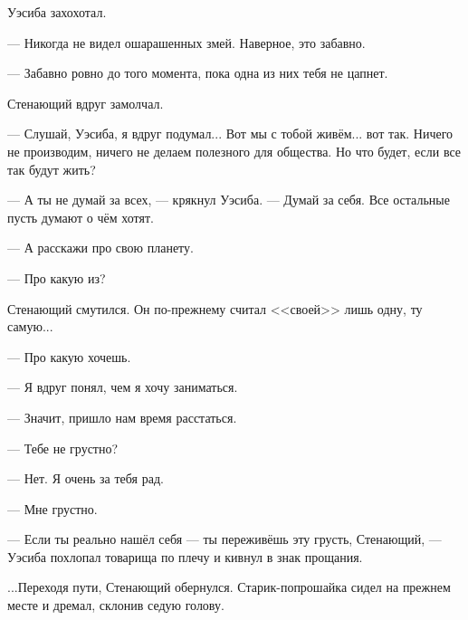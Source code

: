 Уэсиба захохотал.

--- Никогда не видел ошарашенных змей.
Наверное, это забавно.

--- Забавно ровно до того момента, пока одна из них тебя не цапнет.

Стенающий вдруг замолчал.

--- Слушай, Уэсиба, я вдруг подумал...
Вот мы с тобой живём... вот так.
Ничего не производим, ничего не делаем полезного для общества.
Но что будет, если все так будут жить?

--- А ты не думай за всех, --- крякнул Уэсиба.
--- Думай за себя.
Все остальные пусть думают о чём хотят.

--- А расскажи про свою планету.

--- Про какую из?

Стенающий смутился.
Он по-прежнему считал <<своей>> лишь одну, ту самую...

--- Про какую хочешь.

\razd

--- Я вдруг понял, чем я хочу заниматься.

--- Значит, пришло нам время расстаться.

--- Тебе не грустно?

--- Нет.
Я очень за тебя рад.

--- Мне грустно.

--- Если ты реально нашёл себя --- ты переживёшь эту грусть, Стенающий, --- Уэсиба похлопал товарища по плечу и кивнул в знак прощания.

...Переходя пути, Стенающий обернулся.
Старик-попрошайка сидел на прежнем месте и дремал, склонив седую голову.
